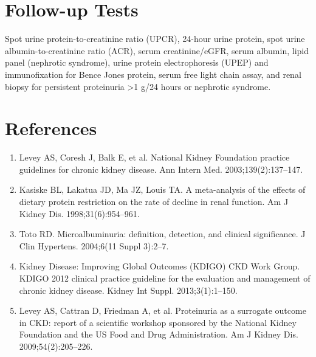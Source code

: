 \section*{Follow-up Tests}
Spot urine protein-to-creatinine ratio (UPCR), 24-hour urine protein, spot urine albumin-to-creatinine ratio (ACR), serum creatinine/eGFR, serum albumin, lipid panel (nephrotic syndrome), urine protein electrophoresis (UPEP) and immunofixation for Bence Jones protein, serum free light chain assay, and renal biopsy for persistent proteinuria >1 g/24 hours or nephrotic syndrome.
\section*{References}
\begin{enumerate}
  \item Levey AS, Coresh J, Balk E, et al. National Kidney Foundation practice guidelines for chronic kidney disease. Ann Intern Med. 2003;139(2):137--147.
  \item Kasiske BL, Lakatua JD, Ma JZ, Louis TA. A meta-analysis of the effects of dietary protein restriction on the rate of decline in renal function. Am J Kidney Dis. 1998;31(6):954--961.
  \item Toto RD. Microalbuminuria: definition, detection, and clinical significance. J Clin Hypertens. 2004;6(11 Suppl 3):2--7.
  \item Kidney Disease: Improving Global Outcomes (KDIGO) CKD Work Group. KDIGO 2012 clinical practice guideline for the evaluation and management of chronic kidney disease. Kidney Int Suppl. 2013;3(1):1--150.
  \item Levey AS, Cattran D, Friedman A, et al. Proteinuria as a surrogate outcome in CKD: report of a scientific workshop sponsored by the National Kidney Foundation and the US Food and Drug Administration. Am J Kidney Dis. 2009;54(2):205--226.
\end{enumerate}
\clearpage
